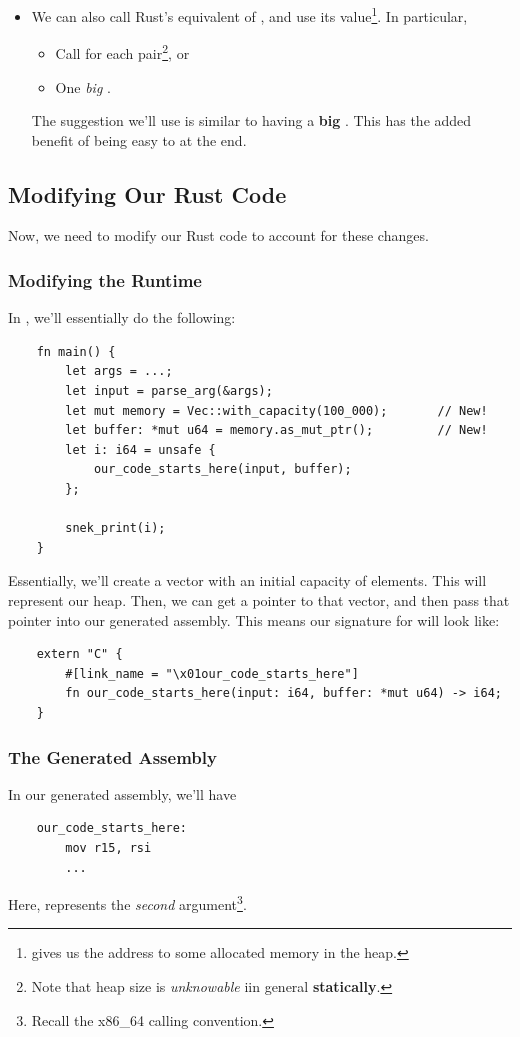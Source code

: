 \begin{itemize}
    \item We can also call Rust's equivalent of , and use its value\footnote{ gives us the address to some allocated memory in the heap.}. In particular, 
    \begin{itemize}
        \item Call  for each pair\footnote{Note that heap size is \emph{unknowable} iin general \textbf{statically}.}, or 
        \item One \emph{big} .
    \end{itemize}
    The suggestion we'll use is similar to having a \textbf{big} . This has the added benefit of being easy to  at the end. 
\end{itemize}

\subsection{Modifying Our Rust Code}
Now, we need to modify our Rust code to account for these changes. 

\subsubsection{Modifying the Runtime}
In , we'll essentially do the following:
\begin{verbatim}
    fn main() {
        let args = ...;
        let input = parse_arg(&args);
        let mut memory = Vec::with_capacity(100_000);       // New!
        let buffer: *mut u64 = memory.as_mut_ptr();         // New! 
        let i: i64 = unsafe {
            our_code_starts_here(input, buffer); 
        };

        snek_print(i);
    }\end{verbatim}
Essentially, we'll create a vector with an initial capacity of  elements. This will represent our heap. Then, we can get a pointer to that vector, and then pass that pointer into our generated assembly. This means our signature for  will look like:
\begin{verbatim}
    extern "C" {
        #[link_name = "\x01our_code_starts_here"]
        fn our_code_starts_here(input: i64, buffer: *mut u64) -> i64;
    }\end{verbatim}

\subsubsection{The Generated Assembly}
In our generated assembly, we'll have 
\begin{verbatim}
    our_code_starts_here:
        mov r15, rsi
        ...\end{verbatim}
Here,  represents the \emph{second} argument\footnote{Recall the x86\_64 calling convention.}. 

